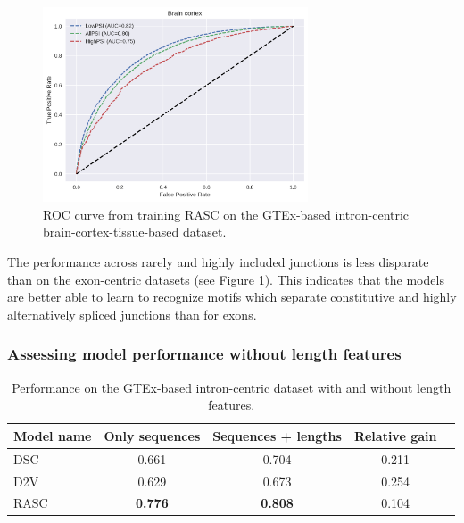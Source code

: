 \begin{figure}[h]
	\centering\includegraphics[width=0.7\textwidth]{../visualizations/ch5-results/gtex_junc_brain_roc.png} 
	\caption{ROC curve from training RASC on the GTEx-based intron-centric brain-cortex-tissue-based dataset. }
	\label{fig:gtex_junc_rocs}
\end{figure}

The performance across rarely and highly included junctions is less disparate than on the exon-centric datasets (see Figure \ref{fig:gtex_junc_rocs}). This indicates that the models are better able to learn to recognize motifs which separate constitutive and highly alternatively spliced junctions than for exons.

\subsubsection{Assessing model performance without length features}

\begin{table}[h!]
	\centering
	\begin{tabular}{| l | c | c | c| c} 
		\hline
		Model name & Only sequences & Sequences + lengths & Relative gain\\
		\hline
		DSC & 0.661 & 0.704 & 0.211\\
		D2V & 0.629 & 0.673 & 0.254\\
		RASC & \textbf{0.776} & \textbf{0.808} & 0.104\\
		\hline
	\end{tabular}
	\caption{Performance on the GTEx-based intron-centric dataset with and without length features. 
	}
	\label{table:gtex_junc_nolens}
\end{table}


